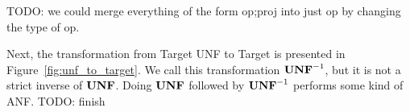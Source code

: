 TODO: we could merge everything of the form op;proj into just op by changing the type of op.



Next, the transformation from Target UNF to Target is presented in Figure~\ref{fig:unf_to_target}. 
We call this transformation $\mathbf{UNF}^{-1}$, but it is not a strict inverse of $\mathbf{UNF}$.
Doing $\mathbf{UNF}$ followed by $\mathbf{UNF}^{-1}$ performs some kind of ANF. 
TODO: finish 


